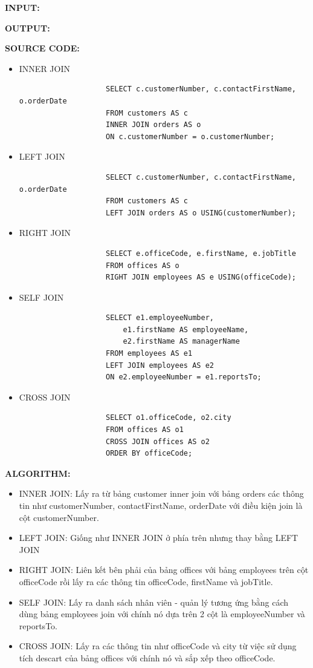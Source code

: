 \documentclass[12pt,a4paper]{report}
\begin{document}
	{\bf INPUT:}
	
	{\bf OUTPUT:}
	
	{\bf SOURCE CODE:}
		\begin{itemize}
			\item INNER JOIN
				\begin{lstlisting}
					SELECT c.customerNumber, c.contactFirstName, o.orderDate
					FROM customers AS c
					INNER JOIN orders AS o
					ON c.customerNumber = o.customerNumber;
				\end{lstlisting}
			\item LEFT JOIN
				\begin{lstlisting}
					SELECT c.customerNumber, c.contactFirstName, o.orderDate
					FROM customers AS c
					LEFT JOIN orders AS o USING(customerNumber);
				\end{lstlisting}
			\item RIGHT JOIN
				\begin{lstlisting}
					SELECT e.officeCode, e.firstName, e.jobTitle
					FROM offices AS o
					RIGHT JOIN employees AS e USING(officeCode);
				\end{lstlisting}
			\item SELF JOIN
				\begin{lstlisting}
					SELECT e1.employeeNumber,
						e1.firstName AS employeeName,
						e2.firstName AS managerName
					FROM employees AS e1
					LEFT JOIN employees AS e2
					ON e2.employeeNumber = e1.reportsTo;
				\end{lstlisting}
			\item CROSS JOIN
				\begin{lstlisting}
					SELECT o1.officeCode, o2.city
					FROM offices AS o1
					CROSS JOIN offices AS o2
					ORDER BY officeCode;
				\end{lstlisting}
		\end{itemize}
		
	{\bf ALGORITHM:}
		\begin{itemize}
			\item INNER JOIN: Lấy ra từ bảng customer inner join với bảng orders các thông tin như customerNumber, contactFirstName, orderDate với điều kiện join là cột customerNumber.
			\item LEFT JOIN: Giống như INNER JOIN ở phía trên nhưng thay bằng LEFT JOIN
			\item RIGHT JOIN: Liên kết bên phải của bảng offices với bảng employees trên cột officeCode rồi lấy ra các thông tin officeCode, firstName và jobTitle.
			\item SELF JOIN: Lấy ra danh sách nhân viên - quản lý tương ứng bằng cách dùng bảng employees join với chính nó dựa trên 2 cột là employeeNumber và reportsTo.
			\item CROSS JOIN: Lấy ra các thông tin như officeCode và city từ việc sử dụng tích descart của bảng offices với chính nó và sắp xếp theo officeCode.
		\end{itemize}
		
\end{document}
